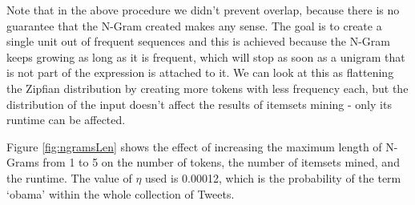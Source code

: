 \documentclass{sig-alternate}
\begin{document}
Note that in the above procedure we didn't prevent overlap, because there is no guarantee that the N-Gram created makes any sense. The goal is to create a single unit out of frequent sequences and this is achieved because the N-Gram keeps growing as long as it is frequent, which will stop as soon as a unigram that is not part of the expression is attached to it. We can look at this as flattening the Zipfian distribution by creating more tokens with less frequency each, but the distribution of the input doesn't affect the results of itemsets mining - only its runtime can be affected.

Figure \ref{fig:ngramsLen} shows the effect of increasing the maximum length of N-Grams from 1 to 5 on the number of tokens, the number of itemsets mined, and the runtime. The value of $\eta$ used is 0.00012, which is the probability of the term `obama' within the whole collection of Tweets.

\end{document}
